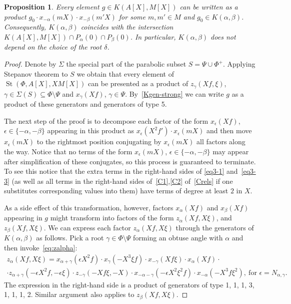 \documentclass[oneside, 8pt]{amsart}
\newtheorem{prop}[lemma]{Proposition}
\theoremstyle{remark}
\theoremstyle{definition}
\numberwithin{lemma}{section}
\numberwithin{prop}{section}
\numberwithin{corollary}{section}
\numberwithin{externaltheorem}{section}
\DeclareMathOperator{\St}{St}
\numberwithin{equation}{section}
\begin{document}
\begin{prop} \label{K-a-b} Every element $g \in K(A[X], M[X])$ can be written as a product $g_0 \cdot x_{-\alpha}(mX) \cdot x_{-\beta}(m'X)$ for some $m, m' \in M$ and $g_0 \in K(\alpha, \beta)$. 
Consequently, $K(\alpha, \beta)$ coincides with the intersection $K(A[X], M[X]) \cap P_\alpha(0) \cap P_\beta(0)$. 
In particular, $K(\alpha, \beta)$ does not depend on the choice of the root $\delta$. \end{prop}
\begin{proof} Denote by $\Sigma$ the special part of the parabolic subset $S = \Psi \cup \Phi^+$. 
Applying Stepanov theorem to $S$ we obtain that every element of $\St(\Phi, A[X], XM[X])$ can be presented as a product of $z_\gamma(Xf, \xi)$, 
$\gamma \in \Sigma(S) \subseteq \Phi\setminus \Psi$ and $x_\gamma(Xf)$, $\gamma \in \Psi$. By~\cref{Kgen-strong} we can write $g$ as a product of these generators and generators of type 5.
  
 The next step of the proof is to decompose each factor of the form $x_{\epsilon}(Xf)$, $\epsilon \in \{-\alpha,-\beta\}$ appearing in this product as
 $x_{\epsilon}(X^2f') \cdot x_{\epsilon}(mX)$ and then move $x_{\epsilon}(mX)$ to the rightmost position conjugating by $x_{\epsilon}(mX)$ all factors along the way.
 Notice that no terms of the form $x_{\epsilon}(mX)$, $\epsilon \in \{ -\alpha, -\beta \}$ may appear after simplification of these conjugates, so this process is guaranteed to terminate.
 To see this notice that the extra terms in the right-hand sides of \eqref{eq3-1} and~\eqref{eq3-3} 
 (as well as all terms in the right-hand sides of~\eqref{C1},\eqref{C2} of~\cref{Crels} if one substitutes corresponding values into them) have terms of degree at least $2$ in $X$. 
  
 As a side effect of this transformation, however, factors $x_\alpha(Xf)$ and $x_\beta(Xf)$ appearing in $g$ might transform into factors of the form $z_\alpha(Xf, X\xi)$, and $z_\beta(Xf, X\xi)$. We can express each factor $z_\alpha(Xf, X\xi)$ through the generators of $K(\alpha, \beta)$ as follows. Pick a root $\gamma \in \Phi\setminus \Psi$ forming an obtuse angle with $\alpha$ and then invoke~\eqref{eq:zalpha}:
 \begin{multline} z_\alpha(Xf, X\xi) = x_{\alpha+\gamma}(\epsilon X^2f) \cdot x_{\gamma}(-X^3 \xi f) \cdot x_{-\gamma}(Xf\xi) \cdot x_\alpha(Xf) \cdot \\ 
 \cdot z_{\alpha+\gamma}(-\epsilon X^2 f, -\epsilon \xi) \cdot z_{-\gamma}(-Xf\xi, -X) \cdot x_{-\alpha-\gamma}(-\epsilon X^2\xi^2 f) \cdot x_{-\alpha}(-X^3 f \xi^2),\ \text{for } \epsilon = N_{\alpha, \gamma}. \end{multline}
 The expression in the right-hand side is a product of generators of type 1, 1, 1, 3, 1, 1, 1, 2. Similar argument also applies to $z_\beta(Xf, X\xi)$.  
 

\end{proof}
\end{document}
